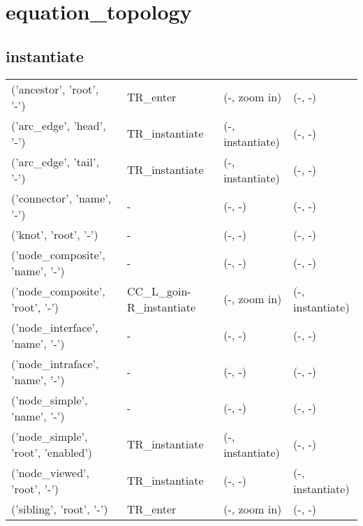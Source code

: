 \def\state#1{#1}
\def\object#1{#1}
\def\cursor#1{#1}
\def\leftnextstate#1{#1}
\def\leftaction#1{#1}
\def\rightnextstate#1{#1}
\def\rightaction#1{#1}
\section{equation\_topology}
\subsection{instantiate}
\begin{tabular}{|l|l|l|l|}
\object{('ancestor', 'root', '-')} &\cursor{TR\_enter} &(\leftnextstate{-}, \leftaction{zoom in}) &(\rightnextstate{-}, \rightaction{-})\\
\object{('arc\_edge', 'head', '-')} &\cursor{TR\_instantiate} &(\leftnextstate{-}, \leftaction{instantiate}) &(\rightnextstate{-}, \rightaction{-})\\
\object{('arc\_edge', 'tail', '-')} &\cursor{TR\_instantiate} &(\leftnextstate{-}, \leftaction{instantiate}) &(\rightnextstate{-}, \rightaction{-})\\
\object{('connector', 'name', '-')} &\cursor{-} &(\leftnextstate{-}, \leftaction{-}) &(\rightnextstate{-}, \rightaction{-})\\
\object{('knot', 'root', '-')} &\cursor{-} &(\leftnextstate{-}, \leftaction{-}) &(\rightnextstate{-}, \rightaction{-})\\
\object{('node\_composite', 'name', '-')} &\cursor{-} &(\leftnextstate{-}, \leftaction{-}) &(\rightnextstate{-}, \rightaction{-})\\
\object{('node\_composite', 'root', '-')} &\cursor{CC\_L\_goin-R\_instantiate} &(\leftnextstate{-}, \leftaction{zoom in}) &(\rightnextstate{-}, \rightaction{instantiate})\\
\object{('node\_interface', 'name', '-')} &\cursor{-} &(\leftnextstate{-}, \leftaction{-}) &(\rightnextstate{-}, \rightaction{-})\\
\object{('node\_intraface', 'name', '-')} &\cursor{-} &(\leftnextstate{-}, \leftaction{-}) &(\rightnextstate{-}, \rightaction{-})\\
\object{('node\_simple', 'name', '-')} &\cursor{-} &(\leftnextstate{-}, \leftaction{-}) &(\rightnextstate{-}, \rightaction{-})\\
\object{('node\_simple', 'root', 'enabled')} &\cursor{TR\_instantiate} &(\leftnextstate{-}, \leftaction{instantiate}) &(\rightnextstate{-}, \rightaction{-})\\
\object{('node\_viewed', 'root', '-')} &\cursor{TR\_instantiate} &(\leftnextstate{-}, \leftaction{-}) &(\rightnextstate{-}, \rightaction{instantiate})\\
\object{('sibling', 'root', '-')} &\cursor{TR\_enter} &(\leftnextstate{-}, \leftaction{zoom in}) &(\rightnextstate{-}, \rightaction{-})\\
\end{tabular}
\\
